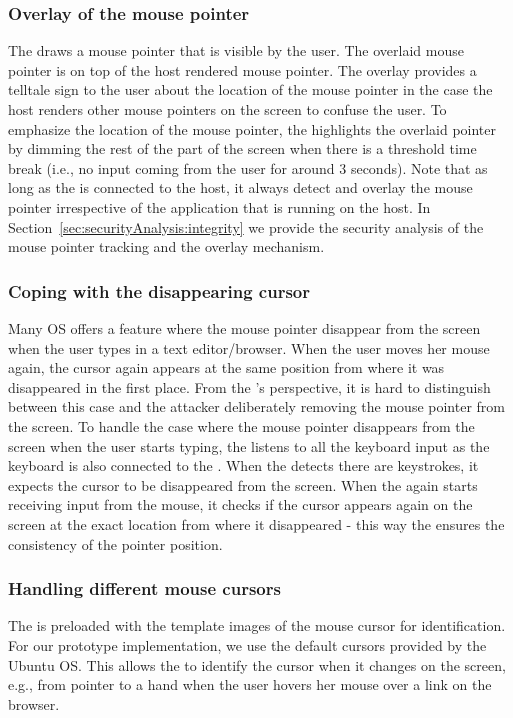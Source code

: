 \subsubsection{\bfseries Overlay of the mouse pointer} The \device draws a mouse pointer that is visible by the user. The overlaid mouse pointer is on top of the host rendered mouse pointer. The overlay provides a telltale sign to the user about the location of the mouse pointer in the case the host renders other mouse pointers on the screen to confuse the user. To emphasize the location of the mouse pointer, the \device highlights the overlaid pointer by dimming the rest of the part of the screen when there is a threshold time break (i.e., no input coming from the user for around 3 seconds). Note that as long as the \device is connected to the host, it always detect and overlay the mouse pointer irrespective of the application that is running on the host. In Section~\ref{sec:securityAnalysis:integrity} we provide the security analysis of the mouse pointer tracking and the overlay mechanism.


\subsubsection{\bfseries Coping with the disappearing cursor} Many OS offers a feature where the mouse pointer disappear from the screen when the user types in a text editor/browser. When the user moves her mouse again, the cursor again appears at the same position from where it was disappeared in the first place. From the \device's perspective, it is hard to distinguish between this case and the attacker deliberately removing the mouse pointer from the screen. To handle the case where the mouse pointer disappears from the screen when the user starts typing, the \device listens to all the keyboard input as the keyboard is also connected to the \device. When the \device detects there are keystrokes, it expects the cursor to be disappeared from the screen. When the \device again starts receiving input from the mouse, it checks if the cursor appears again on the screen at the exact location from where it disappeared - this way the \device ensures the consistency of the pointer position.  


\subsubsection{\bfseries Handling different mouse cursors} The \device is preloaded with the template images of the mouse cursor for identification. For our \name prototype implementation, we use the default cursors provided by the Ubuntu OS. This allows the \device to identify the cursor when it changes on the screen, e.g., from pointer to a hand when the user hovers her mouse over a link on the browser. 



